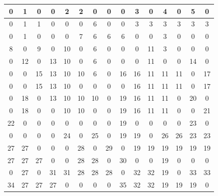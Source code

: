\begin{figure}[H]
	\centering
	\scriptsize %
	\setlength{\tabcolsep}{3.5pt} %
	\renewcommand{\arraystretch}{1.2} %
	\begin{minipage}{0.3\textwidth}
		\centering
		\begin{center}
			\begin{tabular}{|*{15}{c|}}
				\hline
				0 & 1 & 0 & 0 & 2 & 2 & 0 & 0 & 0 & 3 & 0 & 4 & 0 & 5 & 0 \\
				\hline
				0 & 1 & 1 & 0 & 0 & 0 & 6 & 0 & 0 & 3 & 3 & 3 & 3 & 3 & 3 \\
				\hline
				0 & 1 & 0 & 0 & 0 & 7 & 6 & 6 & 6 & 0 & 0 & 3 & 0 & 0 & 0 \\
				\hline
				8 & 0 & 9 & 0 & 10 & 0 & 6 & 0 & 0 & 0 & 11 & 3 & 0 & 0 & 0 \\
				\hline
				0 & 12 & 0 & 13 & 10 & 0 & 6 & 0 & 0 & 0 & 11 & 0 & 0 & 14 & 0 \\
				\hline
				0 & 0 & 15 & 13 & 10 & 10 & 6 & 0 & 16 & 16 & 11 & 11 & 11 & 0 & 17 \\
				\hline
				0 & 0 & 15 & 13 & 10 & 0 & 0 & 0 & 0 & 16 & 11 & 11 & 11 & 0 & 17 \\
				\hline
				0 & 18 & 0 & 13 & 10 & 10 & 10 & 0 & 19 & 16 & 11 & 11 & 0 & 20 & 0 \\
				\hline
				0 & 18 & 0 & 0 & 10 & 10 & 0 & 0 & 19 & 16 & 11 & 11 & 0 & 0 & 21 \\
				\hline
				22 & 0 & 0 & 0 & 0 & 0 & 0 & 0 & 19 & 0 & 0 & 0 & 0 & 23 & 0 \\
				\hline
				0 & 0 & 0 & 0 & 24 & 0 & 25 & 0 & 19 & 19 & 0 & 26 & 26 & 23 & 23 \\
				\hline
				27 & 27 & 0 & 0 & 0 & 28 & 0 & 29 & 0 & 19 & 19 & 19 & 19 & 19 & 19 \\
				\hline
				27 & 27 & 27 & 0 & 0 & 28 & 28 & 0 & 30 & 0 & 0 & 19 & 0 & 0 & 0 \\
				\hline
				0 & 27 & 0 & 31 & 31 & 28 & 28 & 28 & 0 & 32 & 32 & 19 & 0 & 33 & 33 \\
				\hline
				34 & 27 & 27 & 27 & 0 & 0 & 0 & 0 & 35 & 32 & 32 & 19 & 19 & 19 & 0 \\
				\hline
			\end{tabular}
		\end{center}
	\end{minipage}
	\hfill
	\begin{minipage}{0.45\textwidth}
		\centering

\end{minipage}
\end{figure}
